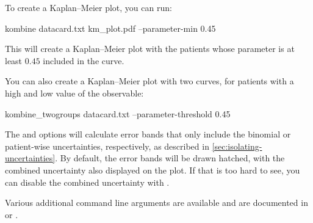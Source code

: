 \documentclass[article]{jss}
\newcommand{\KM}{Kaplan--Meier} %
\begin{document}
To create a \KM{} plot, you can run:
\begin{CodeInput}
kombine datacard.txt km_plot.pdf --parameter-min 0.45
\end{CodeInput}
This will create a \KM{} plot with the patients whose parameter is at least \(0.45\) included in the curve.

You can also create a \KM{} plot with two curves, for patients with a high and low value of the observable:
\begin{CodeInput}
kombine_twogroups datacard.txt --parameter-threshold 0.45
\end{CodeInput}

The  and  options will calculate error bands that only include the binomial or patient-wise uncertainties, respectively, as described in \cref{sec:isolating-uncertainties}.  By default, the error bands will be drawn hatched, with the combined uncertainty also displayed on the plot.  If that is too hard to see, you can disable the combined uncertainty with .

Various additional command line arguments are available and are documented in  or .
\end{document}
